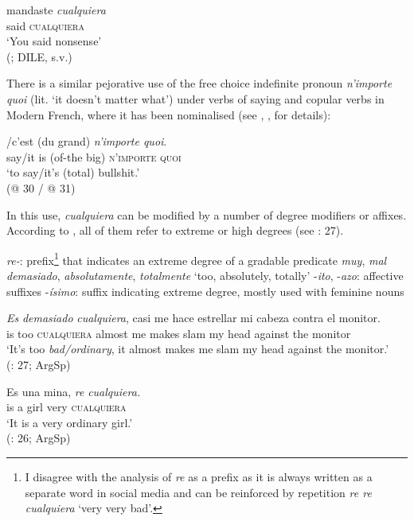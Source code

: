 \ea \label{ex:key:57} %
  \gll mandaste \textit{cualquiera}\\
  said \textsc{cualquiera}\\
  \glt ‘You said nonsense’\\
(\citealt{ditullio2015cualquiera}; DILE, s.v.)
\z

There is a similar pejorative use of the free choice indefinite pronoun \textit{n’importe quoi} (lit. ‘it doesn’t matter what’) under verbs of saying and copular verbs in Modern French, where it has been nominalised (see \citealt{Paillard1997}, \citealt{Pescarini2009},  for details):

\ea \label{ex:key:58} %
  /{c’est} {(du grand)} \textit{n’importe quoi}.\\
  {say}/{it is} {(of-the big)} \textsc{n’importe quoi}\\
  \glt ‘to say/it’s (total) bullshit.’\\
  (@ 30 / @ 31)
\z

In this use, \textit{cualquiera} can be modified by a number of degree modifiers or affixes. According to \citet{Rizzosalierno2013}, all of them refer to extreme or high degrees (see \citealt{Rizzosalierno2013}: 27).


\ea \label{ex:key:59} %
  \textit{re-}: prefix\footnote{{I disagree with the analysis of} {\textit{re}} {as a prefix as it is always written as a separate word in social media and can be reinforced by repetition} {\textit{re re cualquiera}} {‘very very bad’.}}  that indicates an extreme degree of a gradable predicate
\ea \textit{muy}, \textit{mal}
\ex\textit{demasiado}, \textit{absolutamente}, \textit{totalmente} ‘too, absolutely, totally’
\ex-\textit{ito}, -\textit{azo}: affective suffixes
\ex-\textit{ísimo}: suffix indicating extreme degree, mostly used with feminine nouns
\z 
\z 

\ea \label{ex:key:60} %
  \gll \textit{Es} \textit{demasiado} \textit{cualquiera}, casi me hace estrellar mi cabeza contra el monitor.\\
  is too \textsc{cualquiera} almost me makes slam my head against the monitor\\
  \glt ‘It’s too \textit{bad/ordinary}, it almost makes me slam my head against the monitor.’\\
  (\citealt{Rizzosalierno2013}: 27; ArgSp)
\z 

\ea \label{ex:key:61} %
  \gll Es una mina, \textit{re} \textit{cualquiera.}\\
  is a girl very \textsc{cualquiera}\\
  \glt ‘It is a very ordinary girl.’\\
  (\citealt{Rizzosalierno2013}: 26; ArgSp)
\z 

